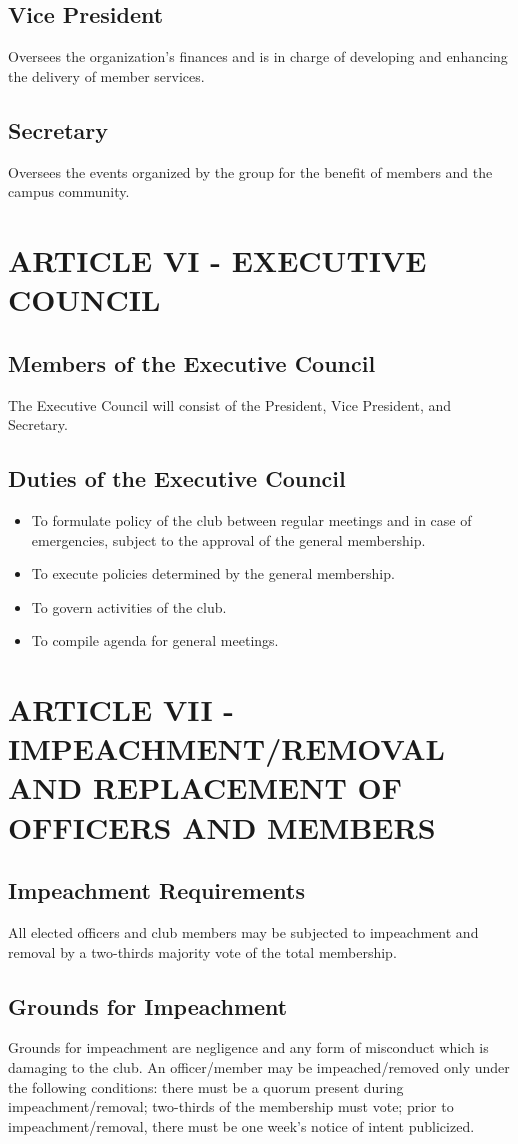 \documentclass[11pt]{amsart}
\begin{document}
\subsection{Vice President}
Oversees the organization’s finances and is in charge of developing and enhancing the delivery of member services.
\subsection{Secretary}
Oversees the events organized by the group for the benefit of members and the campus community.

\section{ARTICLE VI - EXECUTIVE COUNCIL}
\subsection{Members of the Executive Council}
The Executive Council will consist of the President, Vice President, and Secretary.

\subsection{Duties of the Executive Council}
\begin{itemize}
\item{To formulate policy of the club between regular meetings and in case of emergencies, subject to the approval of the general membership.}
\item{To execute policies determined by the general membership.}
\item{To govern activities of the club.}
\item{To compile agenda for general meetings.}
\end{itemize}

\section{ARTICLE VII - IMPEACHMENT/REMOVAL AND REPLACEMENT
OF OFFICERS AND MEMBERS}
\subsection{Impeachment Requirements}
All elected officers and club members may be subjected to impeachment and removal by a two-thirds majority vote of the total membership.
\subsection{Grounds for Impeachment}
Grounds for impeachment are negligence and any form of misconduct which is damaging to the club.  An officer/member may be impeached/removed only under the following conditions: there must be a quorum present during impeachment/removal; two-thirds of the membership must vote; prior to impeachment/removal, there must be one week's notice of intent publicized.
\end{document}
